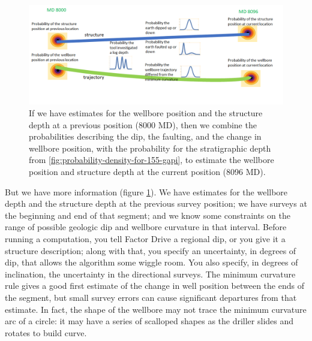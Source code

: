 \documentclass{tufte-handout}
\begin{document}
\begin{figure}
    \includegraphics[width=\linewidth]{neighboring-stations.png}
    \caption{If we have estimates for the wellbore position and the structure depth at a previous
    position (8000 MD), then we combine the probabilities describing the dip, the faulting, and the
    change in wellbore position, with the probability for the stratigraphic depth from 
    \ref{fig:probability-density-for-155-gapi}, to estimate the wellbore position and
    structure depth at the current position (8096 MD).}
    \label{fig:neighboring-stations}
\end{figure}

But we have more information (figure \ref{fig:neighboring-stations}). We have estimates for the wellbore depth and the structure depth 
at the previous survey position; we have surveys at the beginning and end of that segment; and we know
some constraints on the range of possible geologic dip and wellbore curvature in that interval. Before
running a computation, you tell Factor Drive a regional dip, or you give it a structure description;
along with that, you specify an uncertainty, in degrees of dip, that allows the algorithm some wiggle
room. You also specify, in degrees of inclination, the uncertainty in the directional surveys. The
minimum curvature rule gives a good first estimate of the change in well position between
the ends of the segment, but small survey errors can cause significant departures from that estimate.
In fact, the shape of the wellbore may not trace the minimum curvature arc of a circle: it 
may have a series of scalloped shapes as the driller slides and rotates to build curve. 
\end{document}
